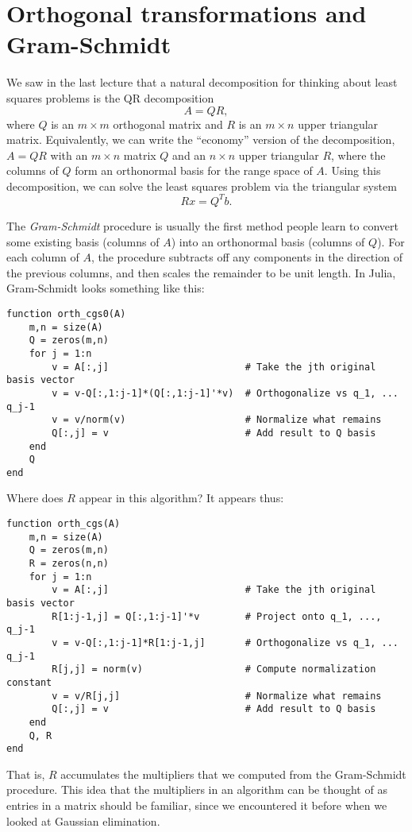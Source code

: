 \documentclass[12pt, leqno]{article}
\begin{document}

\section*{Orthogonal transformations and Gram-Schmidt}

We saw in the last lecture that a natural decomposition for thinking
about least squares problems is the QR decomposition
\[
  A = QR,
\]
where $Q$ is an $m \times m$ orthogonal matrix and $R$ is an $m \times
n$ upper triangular matrix.  Equivalently, we can write the
``economy'' version of the decomposition, $A = QR$ with an $m \times
n$ matrix $Q$ and an $n \times n$ upper triangular $R$, where the
columns of $Q$ form an orthonormal basis for the range space of
$A$. Using this decomposition, we can solve the least squares problem
via the triangular system
\[
  Rx = Q^T b.
\]

The {\em Gram-Schmidt} procedure is usually the first method people
learn to convert some existing basis (columns of $A$) into an
orthonormal basis (columns of $Q$).  For each column of $A$, the procedure
subtracts off any components in the direction of the previous columns,
and then scales the remainder to be unit length. In Julia, Gram-Schmidt looks
something like this:
\begin{lstlisting}
function orth_cgs0(A)
	m,n = size(A)
	Q = zeros(m,n)
	for j = 1:n
		v = A[:,j]                        # Take the jth original basis vector
		v = v-Q[:,1:j-1]*(Q[:,1:j-1]'*v)  # Orthogonalize vs q_1, ... q_j-1
		v = v/norm(v)                     # Normalize what remains
		Q[:,j] = v                        # Add result to Q basis
	end
	Q
end
\end{lstlisting}

Where does $R$ appear in this algorithm?  It appears thus:
\begin{lstlisting}
function orth_cgs(A)
	m,n = size(A)
	Q = zeros(m,n)
	R = zeros(n,n)
	for j = 1:n
		v = A[:,j]                        # Take the jth original basis vector
		R[1:j-1,j] = Q[:,1:j-1]'*v        # Project onto q_1, ..., q_j-1
		v = v-Q[:,1:j-1]*R[1:j-1,j]       # Orthogonalize vs q_1, ... q_j-1
		R[j,j] = norm(v)                  # Compute normalization constant
		v = v/R[j,j]                      # Normalize what remains
		Q[:,j] = v                        # Add result to Q basis
	end
	Q, R
end
\end{lstlisting}
That is, $R$ accumulates the multipliers that we computed from
the Gram-Schmidt procedure.  This idea that the multipliers
in an algorithm can be thought of as entries in a matrix should
be familiar, since we encountered it before when we looked at
Gaussian elimination.
\end{document}
